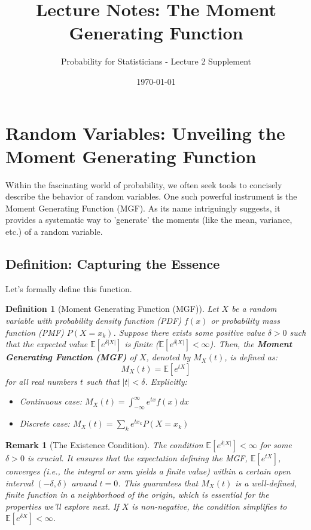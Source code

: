 \documentclass[12pt]{article}
\title{Lecture Notes: The Moment Generating Function}
\author{Probability for Statisticians - Lecture 2 Supplement}
\date{\today}
\newtheorem{definition}[theorem]{Definition}
\newtheorem{remark}[theorem]{Remark}
\begin{document}
\maketitle

\section{Random Variables: Unveiling the Moment Generating Function}

Within the fascinating world of probability, we often seek tools to concisely describe the behavior of random variables. One such powerful instrument is the Moment Generating Function (MGF). As its name intriguingly suggests, it provides a systematic way to 'generate' the moments (like the mean, variance, etc.) of a random variable.

\subsection{Definition: Capturing the Essence}

Let's formally define this function.

\begin{definition}[Moment Generating Function (MGF)]
Let $X$ be a random variable with probability density function (PDF) $f(x)$ or probability mass function (PMF) $P(X=x_k)$. Suppose there exists some positive value $\delta > 0$ such that the expected value $\mathbb{E}[e^{\delta|X|}]$ is finite ($\mathbb{E}[e^{\delta|X|}] < \infty$). Then, the \textbf{Moment Generating Function (MGF)} of $X$, denoted by $M_X(t)$, is defined as:
\[
M_X(t) = \mathbb{E}[e^{tX}]
\]
for all real numbers $t$ such that $|t| < \delta$. Explicitly:
\begin{itemize}
    \item Continuous case: $M_X(t) = \int_{-\infty}^{\infty} e^{tx} f(x) dx$
    \item Discrete case: $M_X(t) = \sum_{k} e^{tx_k} P(X=x_k)$
\end{itemize}
\end{definition}

\begin{remark}[The Existence Condition] %
The condition $\mathbb{E}[e^{\delta|X|}] < \infty$ for some $\delta > 0$ is crucial. It ensures that the expectation defining the MGF, $\mathbb{E}[e^{tX}]$, converges (i.e., the integral or sum yields a finite value) within a certain open interval $(-\delta, \delta)$ around $t=0$. This guarantees that $M_X(t)$ is a well-defined, finite function in a neighborhood of the origin, which is essential for the properties we'll explore next. If $X$ is non-negative, the condition simplifies to $\mathbb{E}[e^{\delta X}] < \infty$.
\end{remark}
\end{document}
